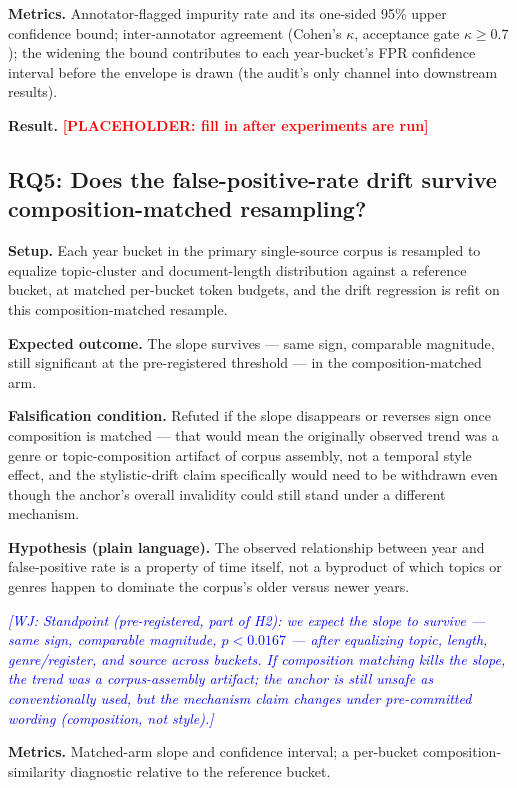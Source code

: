 \documentclass[conference]{IEEEtran}
\newcommand{\placeholder}[1]{\textcolor{red}{\textbf{[PLACEHOLDER: #1]}}}
\newcommand{\wj}[1]{\textcolor{blue}{\emph{[WJ: #1]}}}
\begin{document}
\textbf{Metrics.} Annotator-flagged impurity rate and its one-sided 95\% upper confidence bound; inter-annotator agreement (Cohen's $\kappa$, acceptance gate $\kappa \geq 0.7$); the widening the bound contributes to each year-bucket's FPR confidence interval before the envelope is drawn (the audit's only channel into downstream results).

\textbf{Result.} \placeholder{fill in after experiments are run}

\subsection{RQ5: Does the false-positive-rate drift survive composition-matched resampling?}

 \textbf{Setup.} Each year bucket in the primary single-source corpus is resampled to equalize topic-cluster and document-length distribution against a reference bucket, at matched per-bucket token budgets, and the drift regression is refit on this composition-matched resample.

\textbf{Expected outcome.} The slope survives --- same sign, comparable magnitude, still significant at the pre-registered threshold --- in the composition-matched arm.

\textbf{Falsification condition.} Refuted if the slope disappears or reverses sign once composition is matched --- that would mean the originally observed trend was a genre or topic-composition artifact of corpus assembly, not a temporal style effect, and the stylistic-drift claim specifically would need to be withdrawn even though the anchor's overall invalidity could still stand under a different mechanism.

\textbf{Hypothesis (plain language).} The observed relationship between year and false-positive rate is a property of time itself, not a byproduct of which topics or genres happen to dominate the corpus's older versus newer years.

\wj{Standpoint (pre-registered, part of H2): we expect the slope to survive --- same sign, comparable magnitude, $p<0.0167$ --- after equalizing topic, length, genre/register, and source across buckets. If composition matching kills the slope, the trend was a corpus-assembly artifact; the anchor is still unsafe as conventionally used, but the mechanism claim changes under pre-committed wording (composition, not style).}

\textbf{Metrics.} Matched-arm slope and confidence interval; a per-bucket composition-similarity diagnostic relative to the reference bucket.
\end{document}
